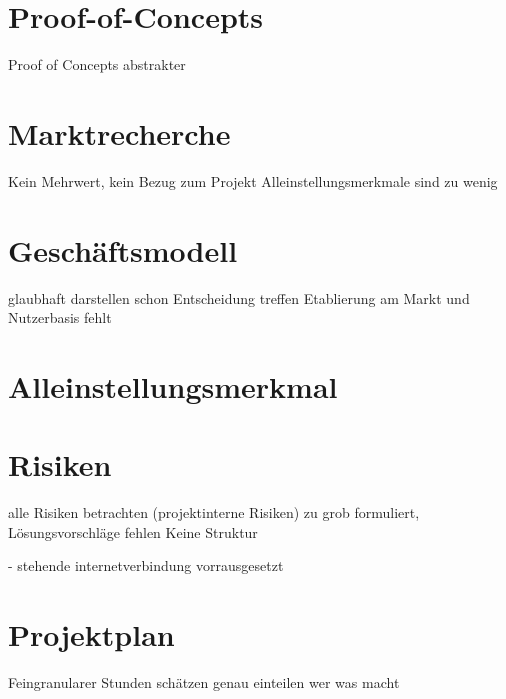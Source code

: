 \documentclass[12pt]{scrartcl}
\begin{document}

\section{Proof-of-Concepts}

Proof of Concepts abstrakter


\section{Marktrecherche}

Kein Mehrwert, kein Bezug zum Projekt
Alleinstellungsmerkmale sind zu wenig


\section{Geschäftsmodell}

glaubhaft darstellen
schon Entscheidung treffen
Etablierung am Markt und Nutzerbasis fehlt


\section{Alleinstellungsmerkmal}


\section{Risiken}

alle Risiken betrachten (projektinterne Risiken)
zu grob formuliert, Lösungsvorschläge fehlen
Keine Struktur

- stehende internetverbindung vorrausgesetzt


\section{Projektplan}

Feingranularer
Stunden schätzen
genau einteilen wer was macht

\end{document}
